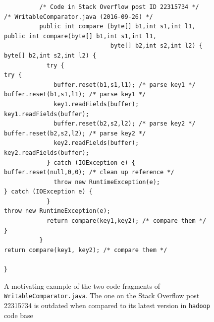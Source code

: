\documentclass[sigconf,review, anonymous]{acmart}
\begin{document}
\begin{figure}
	\begin{lstlisting}
          /* Code in Stack Overflow post ID 22315734 */                  /* WritableComparator.java (2016-09-26) */
          public int compare (byte[] b1,int s1,int l1,                   public int compare(byte[] b1,int s1,int l1,
                              byte[] b2,int s2,int l2) {                                    byte[] b2,int s2,int l2) {
            try {                                                          try {
              buffer.reset(b1,s1,l1); /* parse key1 */                       buffer.reset(b1,s1,l1); /* parse key1 */
              key1.readFields(buffer);                                       key1.readFields(buffer);
              buffer.reset(b2,s2,l2); /* parse key2 */                       buffer.reset(b2,s2,l2); /* parse key2 */
              key2.readFields(buffer);                                       key2.readFields(buffer);
            } catch (IOException e) {                                        buffer.reset(null,0,0); /* clean up reference */
              throw new RuntimeException(e);                               } catch (IOException e) {
            }                                                                throw new RuntimeException(e);
            return compare(key1,key2); /* compare them */                  }
          }                                                                return compare(key1, key2); /* compare them */
	                                                                       }
	\end{lstlisting}
	\caption{A motivating example of the two code fragments of {\small\texttt{WritableComparator.java}}. The one on the Stack Overflow post 22315734 is outdated when compared to its latest version in {\small\texttt{hadoop}} code base}
	\label{fig:before-after}
\end{figure}
\end{document}
